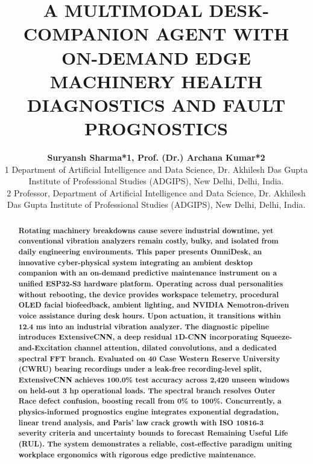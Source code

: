 \documentclass[10pt,journal,onecolumn]{IEEEtran}
\begin{document}
\title{\LARGE \textbf{A MULTIMODAL DESK-COMPANION AGENT WITH ON-DEMAND EDGE MACHINERY HEALTH DIAGNOSTICS AND FAULT PROGNOSTICS}}

\author{
\textbf{Suryansh Sharma*1, Prof. (Dr.) Archana Kumar*2}\\
\small *1 Department of Artificial Intelligence and Data Science, Dr. Akhilesh Das Gupta Institute of Professional Studies (ADGIPS), New Delhi, Delhi, India.\\
\small *2 Professor, Department of Artificial Intelligence and Data Science, Dr. Akhilesh Das Gupta Institute of Professional Studies (ADGIPS), New Delhi, Delhi, India.
}

\maketitle

\begin{abstract}
\textbf{Rotating machinery breakdowns cause severe industrial downtime, yet conventional vibration analyzers remain costly, bulky, and isolated from daily engineering environments. This paper presents OmniDesk, an innovative cyber-physical system integrating an ambient desktop companion with an on-demand predictive maintenance instrument on a unified ESP32-S3 hardware platform. Operating across dual personalities without rebooting, the device provides workspace telemetry, procedural OLED facial biofeedback, ambient lighting, and NVIDIA Nemotron-driven voice assistance during desk hours. Upon actuation, it transitions within 12.4 ms into an industrial vibration analyzer. The diagnostic pipeline introduces ExtensiveCNN, a deep residual 1D-CNN incorporating Squeeze-and-Excitation channel attention, dilated convolutions, and a dedicated spectral FFT branch. Evaluated on 40 Case Western Reserve University (CWRU) bearing recordings under a leak-free recording-level split, ExtensiveCNN achieves 100.0\% test accuracy across 2,420 unseen windows on held-out 3 hp operational loads. The spectral branch resolves Outer Race defect confusion, boosting recall from 0\% to 100\%. Concurrently, a physics-informed prognostics engine integrates exponential degradation, linear trend analysis, and Paris' law crack growth with ISO 10816-3 severity criteria and uncertainty bounds to forecast Remaining Useful Life (RUL). The system demonstrates a reliable, cost-effective paradigm uniting workplace ergonomics with rigorous edge predictive maintenance.}
\end{abstract}
\end{document}
